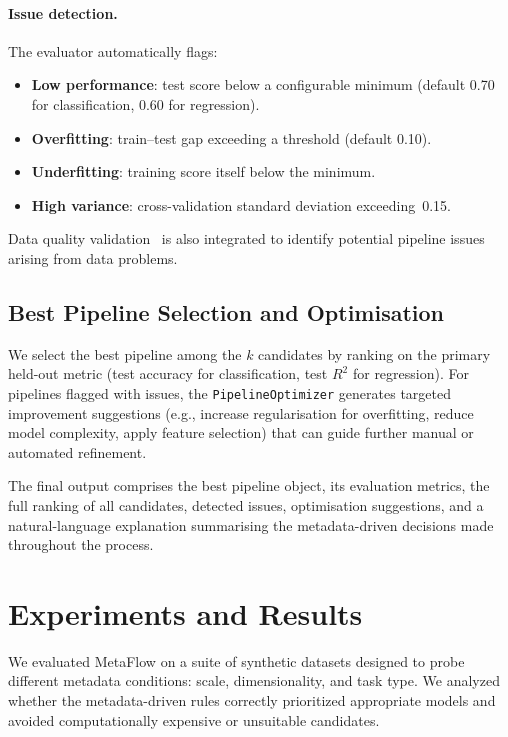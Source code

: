 \documentclass[conference]{llncs}
\begin{document}
   \paragraph{Issue detection.}
   The evaluator automatically flags:
   \begin{itemize}
   \item \textbf{Low performance}: test score below a configurable minimum (default 0.70 for classification, 0.60 for regression).
   \item \textbf{Overfitting}: train--test gap exceeding a threshold (default 0.10).
   \item \textbf{Underfitting}: training score itself below the minimum.
   \item \textbf{High variance}: cross-validation standard deviation exceeding~0.15.
   \end{itemize}
   Data quality validation~\cite{schelter2018detecting} is also integrated to identify potential pipeline issues arising from data problems.

   \subsection{Best Pipeline Selection and Optimisation}
   \label{sec:best_selection}

   We select the best pipeline among the $k$ candidates by ranking on the primary held-out metric (test accuracy for classification, test $R^2$ for regression).
   For pipelines flagged with issues, the \texttt{PipelineOptimizer} generates targeted improvement suggestions (e.g., increase regularisation for overfitting, reduce model complexity, apply feature selection) that can guide further manual or automated refinement.

   The final output comprises the best pipeline object, its evaluation metrics, the full ranking of all candidates, detected issues, optimisation suggestions, and a natural-language explanation summarising the metadata-driven decisions made throughout the process.

   \section{Experiments and Results}
   \label{sec:experiments}

   We evaluated MetaFlow on a suite of synthetic datasets designed to probe different metadata conditions: scale, dimensionality, and task type. We analyzed whether the metadata-driven rules correctly prioritized appropriate models and avoided computationally expensive or unsuitable candidates.
\end{document}
